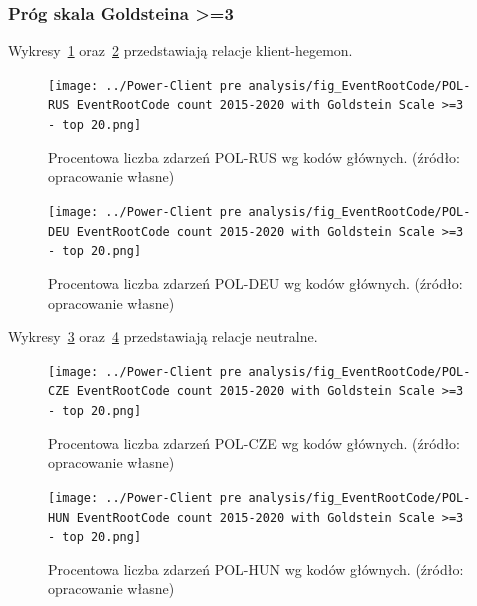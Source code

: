 \documentclass[11pt]{report}
\begin{document}
    \subsubsection{Próg skala Goldsteina >=3}\label{subsubsec:erc:próg-skala-goldsteina->=3}

    Wykresy~\ref{fig:Power-Client:ERC:Goldstein:POL-RUS} oraz~\ref{fig:Power-Client:ERC:Goldstein:POL-DEU} przedstawiają relacje klient-hegemon.

    \begin{figure}[!htp]
        \centering
        \texttt{[image: ../Power-Client pre analysis/fig\_EventRootCode/POL-RUS EventRootCode count 2015-2020 with Goldstein Scale >=3 - top 20.png]}
        \caption{Procentowa liczba zdarzeń POL-RUS wg kodów głównych. (źródło: opracowanie własne)}
        \label{fig:Power-Client:ERC:Goldstein:POL-RUS}
    \end{figure}

    \begin{figure}[!htp]
        \centering
        \texttt{[image: ../Power-Client pre analysis/fig\_EventRootCode/POL-DEU EventRootCode count 2015-2020 with Goldstein Scale >=3 - top 20.png]}
        \caption{Procentowa liczba zdarzeń POL-DEU wg kodów głównych. (źródło: opracowanie własne)}
        \label{fig:Power-Client:ERC:Goldstein:POL-DEU}
    \end{figure}

    Wykresy~\ref{fig:Power-Client:ERC:Goldstein:POL-CZE} oraz~\ref{fig:Power-Client:ERC:Goldstein:POL-HUN} przedstawiają relacje neutralne.


    \begin{figure}[!htp]
        \centering
        \texttt{[image: ../Power-Client pre analysis/fig\_EventRootCode/POL-CZE EventRootCode count 2015-2020 with Goldstein Scale >=3 - top 20.png]}
        \caption{Procentowa liczba zdarzeń POL-CZE wg kodów głównych. (źródło: opracowanie własne)}
        \label{fig:Power-Client:ERC:Goldstein:POL-CZE}
    \end{figure}

    \begin{figure}[!htp]
        \centering
        \texttt{[image: ../Power-Client pre analysis/fig\_EventRootCode/POL-HUN EventRootCode count 2015-2020 with Goldstein Scale >=3 - top 20.png]}
        \caption{Procentowa liczba zdarzeń POL-HUN wg kodów głównych. (źródło: opracowanie własne)}
        \label{fig:Power-Client:ERC:Goldstein:POL-HUN}
    \end{figure}
\end{document}
